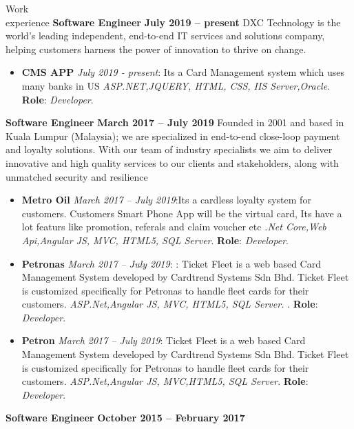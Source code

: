 \documentclass{resume}
\begin{document}
\begin{category}{Work \\experience}
  \citemnobullet \textbf{Software  Engineer} \hfill \textbf{July  2019 -- present}
  \citemnobullet DXC Technology is the world’s leading independent, end-to-end IT services and solutions company, helping customers harness the power of innovation to thrive on change.
  \begin{itemize}
  \item \textbf{CMS APP} {\em July 2019 - present}: Its a Card Management system which uses many banks in US {\em ASP.NET,JQUERY, HTML, CSS, IIS Server,Oracle}. \textbf{Role}: {\em Developer}. 
  \end{itemize}
  \citemnobullet \textbf{Software Engineer} \hfill \textbf{March 2017 – July 2019}
  \citemnobullet Founded in 2001 and based in Kuala Lumpur (Malaysia); we are specialized in end-to-end close-loop payment and loyalty solutions. With our team of industry specialists we aim to deliver innovative and high quality services to our clients and stakeholders, along with unmatched security and resilience
  \begin{itemize}
  \item \textbf{Metro Oil} {\em March 2017 – July 2019}:Its a cardless loyalty system for customers. Customers Smart Phone App will be the virtual card, Its have a lot featurs like promotion, referals and claim voucher etc {\em  .Net Core,Web Api,Angular JS, MVC, HTML5, SQL Server}. \textbf{Role}: {\em Developer}. 
  \item \textbf{Petronas} {\em March 2017 – July 2019}: : Ticket Fleet is a web based Card Management System
developed by Cardtrend Systems Sdn Bhd. Ticket Fleet is customized specifically
for Petronas to handle fleet cards for their customers. {\em ASP.Net,Angular JS, MVC, HTML5, SQL Server. }. \textbf{Role}: {\em Developer}. 
  \item \textbf{Petron} {\em March 2017 – July 2019}: Ticket Fleet is a web based Card Management System developed by Cardtrend Systems Sdn Bhd. Ticket Fleet is customized specifically for Petronas to handle fleet cards for their customers. {\em ASP.Net,Angular JS, MVC,HTML5, SQL Server}. \textbf{Role}: {\em Developer}. 
  \end{itemize}
  \citemnobullet \textbf{Software Engineer} \hfill \textbf{October 2015 -- February 2017}

\end{category}
\end{document}
